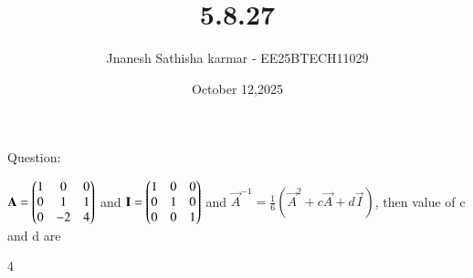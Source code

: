 \documentclass{beamer}
\title %
{5.8.27}
\date{October 12,2025}
\author 
{Jnanesh Sathisha karmar - EE25BTECH11029}
\begin{document}
\frame{\titlepage}
\begin{frame}{Question:}


\noindent $\mathbf{A}=\begin{pmatrix}1 & 0 & 0\\0 & 1 & 1\\0 & -2 & 4\end{pmatrix}$ and $\mathbf{I}=\begin{pmatrix}1 & 0 & 0\\0 & 1 & 0\\0 & 0 &1\end{pmatrix}$ and $\vec{A}^{-1} = \frac{1}{6}(\vec{A}^2 + c\vec{A} + d\vec{I})$, then value of c and d are
\begin{enumerate}
\begin{multicols}{4}
    \item {}
    \item {}
    \item {}
    \item {}
\end{multicols}
\end{enumerate}
\end{frame}
\end{document}
